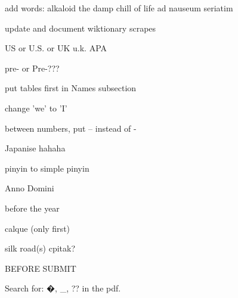 add words:
alkaloid
the damp chill of life
ad nauseum
seriatim

update and document wiktionary scrapes

US or U.S. or UK u.k. APA

pre- or Pre-???


put tables first in Names subsection

change 'we' to 'I'

between numbers, put -- instead of -

Japanise hahaha

pinyin to simple pinyin


Anno Domini

before the year

calque (only first)

silk road(s) cpitak?

BEFORE SUBMIT

Search for: �, _, ?? in the pdf.